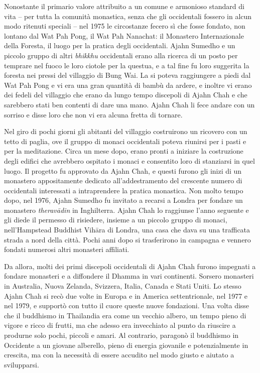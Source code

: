 Nonostante il primario valore attribuito a un comune e armonioso
standard di vita -- per tutta la comunità monastica, senza che gli
occidentali fossero in alcun modo ritenuti speciali -- nel 1975 le
circostanze fecero sì che fosse fondato, non lontano dal Wat Pah Pong,
il Wat Pah Nanachat: il Monastero Internazionale della Foresta, il luogo
per la pratica degli occidentali. Ajahn Sumedho e un piccolo gruppo di
altri \emph{bhikkhu} occidentali erano alla ricerca di un posto per
temprare nel fuoco le loro ciotole per la questua, e a tal fine fu loro
suggerita la foresta nei pressi del villaggio di Bung Wai. La si poteva
raggiungere a piedi dal Wat Pah Pong e vi era una gran quantità di bambù
da ardere, e inoltre vi erano dei fedeli del villaggio che erano da
lungo tempo discepoli di Ajahn Chah e che sarebbero stati ben contenti
di dare una mano. Ajahn Chah li fece andare con un sorriso e disse loro
che non vi era alcuna fretta di tornare.

Nel giro di pochi giorni gli abitanti del villaggio costruirono un
ricovero con un tetto di paglia, ove il gruppo di monaci occidentali
poteva riunirsi per i pasti e per la meditazione. Circa un mese dopo,
erano pronti a iniziare la costruzione degli edifici che avrebbero
ospitato i monaci e consentito loro di stanziarsi in quel luogo. Il
progetto fu approvato da Ajahn Chah, e questi furono gli inizi di un
monastero appositamente dedicato all'addestramento del crescente numero
di occidentali interessati a intraprendere la pratica monastica. Non
molto tempo dopo, nel 1976, Ajahn Sumedho fu invitato a recarsi a Londra
per fondare un monastero \emph{theravādin} in Inghilterra. Ajahn Chah lo
raggiunse l'anno seguente e gli diede il permesso di risiedere, insieme
a un piccolo gruppo di monaci, nell'Hampstead Buddhist Vihāra di Londra,
una casa che dava su una trafficata strada a nord della città. Pochi
anni dopo si trasferirono in campagna e vennero fondati numerosi altri
monasteri affiliati.

Da allora, molti dei primi discepoli occidentali di Ajahn Chah furono
impegnati a fondare monasteri e a diffondere il Dhamma in vari
continenti. Sorsero monasteri in Australia, Nuova Zelanda, Svizzera,
Italia, Canada e Stati Uniti. Lo stesso Ajahn Chah si recò due volte in
Europa e in America settentrionale, nel 1977 e nel 1979, e supportò con
tutto il cuore queste nuove fondazioni. Una volta disse che il buddhismo
in Thailandia era come un vecchio albero, un tempo pieno di vigore e
ricco di frutti, ma che adesso era invecchiato al punto da riuscire a
produrne solo pochi, piccoli e amari. Al contrario, paragonò il
buddhismo in Occidente a un giovane alberello, pieno di energia
giovanile e potenzialmente in crescita, ma con la necessità di essere
accudito nel modo giusto e aiutato a svilupparsi.


